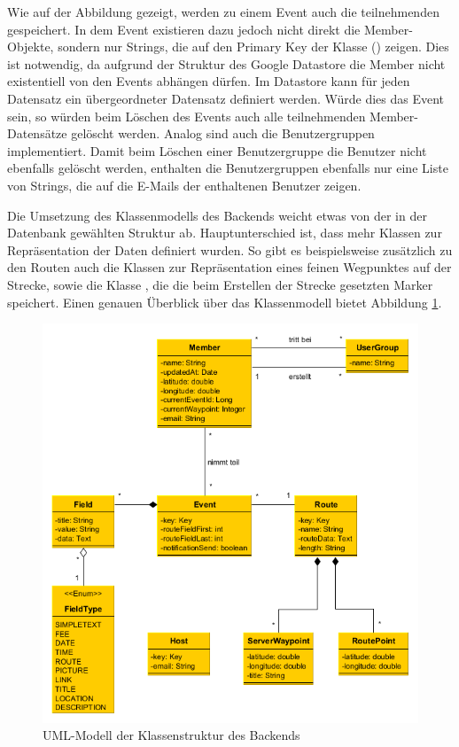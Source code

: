 Wie auf der Abbildung gezeigt, werden zu einem Event auch die teilnehmenden  gespeichert. In dem Event existieren dazu jedoch nicht direkt die Member-Objekte, sondern nur Strings, die auf den Primary Key der Klasse  () zeigen. Dies ist notwendig, da aufgrund der Struktur des Google Datastore die Member nicht existentiell von den Events abhängen dürfen. Im Datastore kann für jeden Datensatz ein übergeordneter Datensatz definiert werden. Würde dies das Event sein, so würden beim Löschen des Events auch alle teilnehmenden Member-Datensätze gelöscht werden. Analog sind auch die Benutzergruppen implementiert. Damit beim Löschen einer Benutzergruppe die Benutzer nicht ebenfalls gelöscht werden, enthalten die Benutzergruppen ebenfalls nur eine Liste von Strings, die auf die E-Mails der enthaltenen Benutzer zeigen.

Die Umsetzung des Klassenmodells des Backends weicht etwas von der in der Datenbank gewählten Struktur ab. Hauptunterschied ist, dass mehr Klassen zur Repräsentation der Daten definiert wurden. So gibt es beispielsweise zusätzlich zu den Routen auch die Klassen  zur Repräsentation eines feinen Wegpunktes auf der Strecke, sowie die Klasse , die die beim Erstellen der Strecke gesetzten Marker speichert. Einen genauen Überblick über das Klassenmodell bietet Abbildung \ref{fig:backend_uml}.

\begin{figure}[htb]
\centering
\includegraphics[width=\textwidth]{graphics/backend_uml.png}
\caption{UML-Modell der Klassenstruktur des Backends}
\label{fig:backend_uml}
\end{figure}

